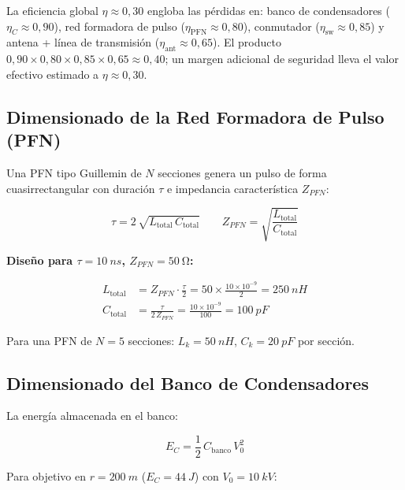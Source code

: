 \documentclass[12pt,a4paper]{article}
\begin{document}
\begin{notatec}
  La eficiencia global $\eta \approx 0{,}30$ engloba las pérdidas en:
  banco de condensadores ($\eta_C \approx 0{,}90$), red formadora de pulso
  ($\eta_\mathrm{PFN} \approx 0{,}80$), conmutador ($\eta_\mathrm{sw} \approx 0{,}85$)
  y antena + línea de transmisión ($\eta_\mathrm{ant} \approx 0{,}65$).
  El producto $0{,}90 \times 0{,}80 \times 0{,}85 \times 0{,}65 \approx 0{,}40$;
  un margen adicional de seguridad lleva el valor efectivo estimado a $\eta \approx 0{,}30$.
\end{notatec}

\subsection{Dimensionado de la Red Formadora de Pulso (PFN)}

Una PFN tipo Guillemin de $N$ secciones genera un pulso de forma
cuasirrectangular con duración $\tau$ e impedancia característica $Z_{PFN}$:

\begin{equation}
  \tau = 2\,\sqrt{L_\mathrm{total}\,C_\mathrm{total}}
  \qquad
  Z_{PFN} = \sqrt{\frac{L_\mathrm{total}}{C_\mathrm{total}}}
  \label{eq:pfn}
\end{equation}

\textbf{Diseño para $\tau = \SI{10}{ns}$, $Z_{PFN} = \SI{50}{\ohm}$:}

\begin{align}
  L_\mathrm{total} &= Z_{PFN}\cdot\frac{\tau}{2}
    = 50 \times \frac{10\times10^{-9}}{2} = \SI{250}{nH} \\[4pt]
  C_\mathrm{total} &= \frac{\tau}{2\,Z_{PFN}}
    = \frac{10\times10^{-9}}{100} = \SI{100}{pF}
\end{align}

Para una PFN de $N=5$ secciones: $L_k = \SI{50}{nH}$, $C_k = \SI{20}{pF}$ por sección.

\subsection{Dimensionado del Banco de Condensadores}

La energía almacenada en el banco:

\begin{equation}
  E_C = \frac{1}{2}\,C_\mathrm{banco}\,V_0^2
  \label{eq:banco}
\end{equation}

Para objetivo en $r = \SI{200}{m}$ ($E_C = \SI{44}{J}$) con $V_0 = \SI{10}{kV}$:
\end{document}
